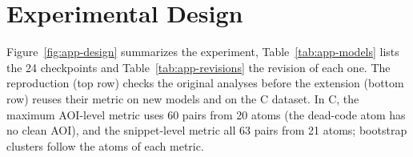 \appendix
\raggedbottom

\section{Experimental Design}
\label{app:design}

Figure~\ref{fig:app-design} summarizes the experiment, Table~\ref{tab:app-models} lists the 24 checkpoints and Table~\ref{tab:app-revisions} the revision of each one.
The reproduction (top row) checks the original analyses before the extension (bottom row) reuses their metric on new models and on the C dataset.
In C, the maximum AOI-level metric uses 60 pairs from 20 atoms (the dead-code atom has no clean AOI), and the snippet-level metric all 63 pairs from 21 atoms; bootstrap clusters follow the atoms of each metric.

